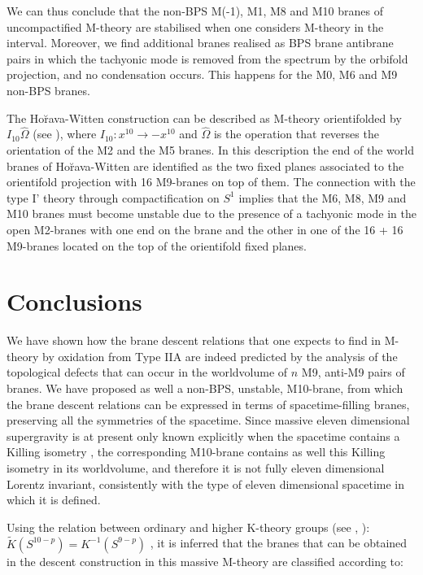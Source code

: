 \documentclass[12pt,a4paper]{article}
\begin{document}
We can thus conclude that the non-BPS M(-1), M1, M8 and M10 
branes of uncompactified M-theory are
stabilised when one considers M-theory in the interval. Moreover, we
find additional branes realised as BPS brane
antibrane pairs in which the tachyonic mode is removed from the
spectrum by the orbifold projection, and no condensation occurs.
This happens for the M0, M6 and M9 non-BPS branes.

The Ho\u{r}ava-Witten construction can be described 
as M-theory orientifolded by $I_{10}{\hat \Omega}$ (see \cite{BEHHLvdS}),
where $I_{10}: x^{10} \rightarrow -x^{10}$ and 
${\hat \Omega}$ is the operation that reverses the orientation
of the M2 and the M5 branes. 
In this description
the end of the world branes of Ho\u{r}ava-Witten are identified as
the two fixed planes associated to the orientifold projection with
16 M9-branes on top of them. The connection with the
type I' theory through compactification on $S^1$ implies that the
M6, M8, M9 and M10 branes must become unstable due to the presence of
a tachyonic mode in the open M2-branes with one end on the brane
and the other in one of the 16 + 16 M9-branes located on the top of the 
orientifold fixed planes.


 
 
\section{Conclusions}

We have shown how the brane descent relations that one expects to find
in M-theory by oxidation from Type IIA are indeed predicted
by the analysis of the topological defects that can occur in the worldvolume
of $n$ M9, anti-M9 pairs of branes. We have proposed as well a
non-BPS, unstable, M10-brane, from which the brane descent
relations can be expressed in terms of spacetime-filling branes, 
preserving all the 
symmetries of the spacetime. Since massive eleven dimensional
supergravity is at present only known explicitly when the spacetime
contains a Killing isometry \cite{BLO}, the corresponding 
M10-brane contains as
well this Killing isometry in its worldvolume, and therefore 
it is not fully eleven dimensional Lorentz
invariant, consistently with the type of eleven
dimensional spacetime in which it is defined.

Using the relation between ordinary and higher K-theory
groups (see \cite{Horava}, \cite{OS}): 
${\tilde K}(S^{10-p})=K^{-1}(S^{9-p})$ , 
it is inferred that the branes that can be obtained in the
descent construction in this massive M-theory  are
classified according to:
\end{document}
